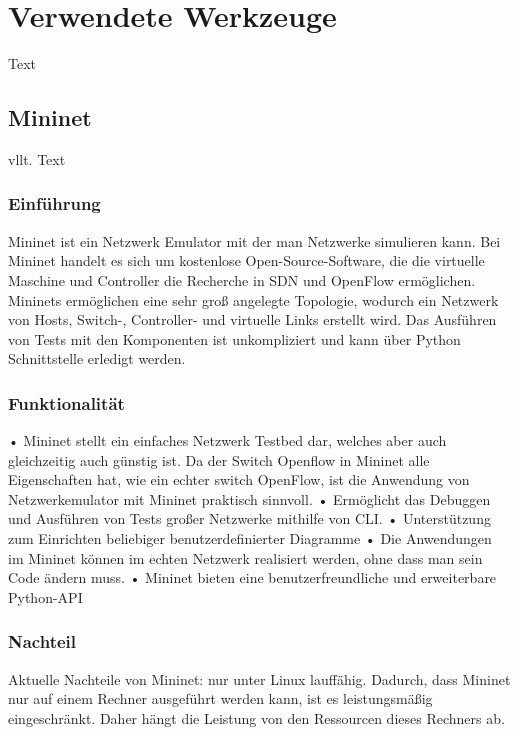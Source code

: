 \documentclass[fontsize=12pt,paper=a4,open=any,parskip=half,
  twoside=false,toc=listof,toc=bibliography,fleqn,leqno,
  captions=nooneline,captions=tableabove,british]{scrbook}
\begin{document}
\section{Verwendete Werkzeuge}
Text
\subsection{Mininet}
vllt. Text
\subsubsection{Einführung}
Mininet ist ein Netzwerk Emulator mit der man Netzwerke simulieren kann. Bei Mininet handelt es sich um kostenlose Open-Source-Software, die die virtuelle Maschine und Controller die Recherche in SDN und OpenFlow ermöglichen.
Mininets ermöglichen eine sehr groß angelegte Topologie, wodurch ein Netzwerk von Hosts, Switch-, Controller- und virtuelle Links erstellt wird. Das Ausführen von Tests mit den Komponenten ist unkompliziert und kann über Python Schnittstelle erledigt werden.
\subsubsection{Funktionalität}
•      Mininet stellt ein einfaches Netzwerk Testbed dar, welches aber auch gleichzeitig auch günstig ist. Da der Switch Openflow in Mininet alle Eigenschaften hat, wie ein echter switch OpenFlow, ist die Anwendung von Netzwerkemulator mit Mininet praktisch sinnvoll.
•      Ermöglicht das Debuggen und Ausführen von Tests großer Netzwerke mithilfe von CLI.
•      Unterstützung zum Einrichten beliebiger benutzerdefinierter Diagramme
•      Die Anwendungen im Mininet können im echten Netzwerk realisiert werden, ohne dass man sein Code ändern muss.
•      Mininet bieten eine benutzerfreundliche und erweiterbare Python-API

\subsubsection{Nachteil}
Aktuelle Nachteile von Mininet: nur unter Linux lauffähig. Dadurch, dass Mininet nur auf einem Rechner ausgeführt werden kann, ist es leistungsmäßig eingeschränkt. Daher hängt die Leistung von den Ressourcen dieses Rechners ab.
\end{document}
